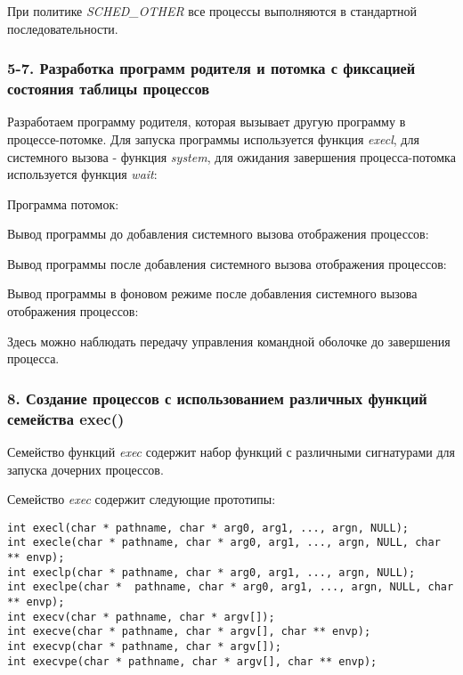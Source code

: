\documentclass[14pt,a4paper,report]{report}
\begin{document}


При политике \emph{SCHED\_OTHER} все процессы выполняются в стандартной последовательности.

\subsubsection{5-7. Разработка программ родителя и потомка с фиксацией состояния таблицы процессов}

Разработаем программу родителя, которая вызывает другую программу в процессе-потомке. Для запуска программы используется функция \emph{execl}, для системного вызова - функция \emph{system}, для ожидания завершения процесса-потомка используется функция \emph{wait}:



Программа потомок:



Вывод программы до добавления системного вызова отображения процессов:



Вывод программы после добавления системного вызова отображения процессов:



Вывод программы в фоновом режиме после добавления системного вызова отображения процессов:



Здесь можно наблюдать передачу управления командной оболочке до завершения процесса.

\subsubsection{8. Создание процессов с использованием различных функций семейства exec()}

Семейство функций \emph{exec} содержит набор функций с различными сигнатурами для запуска дочерних процессов.

Семейство \emph{exec} содержит следующие прототипы:

\begin{verbatim}
int execl(char * pathname, char * arg0, arg1, ..., argn, NULL);
int execle(char * pathname, char * arg0, arg1, ..., argn, NULL, char ** envp);
int execlp(char * pathname, char * arg0, arg1, ..., argn, NULL);
int execlpe(char *  pathname, char * arg0, arg1, ..., argn, NULL, char ** envp);
int execv(char * pathname, char * argv[]);
int execve(char * pathname, char * argv[], char ** envp);
int execvp(char * pathname, char * argv[]);
int execvpe(char * pathname, char * argv[], char ** envp);
\end{verbatim}
\end{document}
